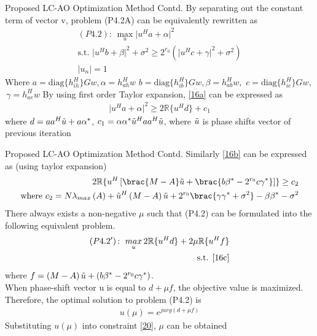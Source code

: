 \documentclass{beamer}
\providecommand{\brak}[1]{\ensuremath{\left(#1\right)}}
\providecommand{\abs}[1]{\vert#1\vert}
\providecommand{\sbrak}[1]{\ensuremath{{}\left[#1\right]}}
\begin{document}
\begin{frame}{Proposed LC-AO Optimization Method Contd.}
    By separating out the constant term of vector
v, problem (P4.2A) can be equivalently rewritten as
    \begin{align}
    \brak{P4.2}\text{: }\mathop{max}_{u} \abs{u^{H}a+\alpha}^2 \label{16a}\\ 
    \text{s.t. } \abs{u^{H}b+\beta}^{2}+\sigma^{2}\geq 2^{r_{0}}\brak{ \abs{u^{H}c+\gamma}^{2}+\sigma^{2}}\label{16b}\\
    \abs{u_{n}}=1 \label{16c}
    \end{align}
    Where  $a=\text{diag}\{h^{H}_{ih}\}Gw$,\,$\alpha=h_{ah}^{H}w$ $b=\text{diag}\{h^{H}_{ib}\}Gw$,\,$\beta=h_{ab}^{H}w$, \,$c=\text{diag}\{h^{H}_{ie}\}Gw$, \,$\gamma=h_{ae}^{H}w$
    By using first order Taylor expansion, \eqref{16a} can be expressed as 
    \begin{align}
        \abs{u^{H}a+\alpha}^2\geq 2\mathbb{R}\{u^{H}d\} +c_{1}
    \end{align}
    where $d=aa^{H}\Tilde{u}+a\alpha^{*}$, $c_{1}=\alpha\alpha^{*}\Tilde{u}^{H}aa^{H}\Tilde{u}$, where $\Tilde{u}$ is phase shifts vector of previous iteration 
\end{frame}
\begin{frame}{Proposed LC-AO Optimization Method Contd.}
    Similarly \eqref{16b} can be expressed as (using taylor expansion)
    \begin{align}
    2\mathbb{R}\{u^{H}\sbrak{\brac{M-A}\Tilde{u}+\brac{b\beta^{*}-2^{r_{0}}c\gamma^{*}}}\}\geq c_{2}\label{20}\\
    \text{where  } c_{2}=N\lambda_{max}\brak{A}+\Tilde{u}^{H}\brak{M-A}\Tilde{u}+2^{r_{0}}\brac{\gamma \gamma^{*} + \sigma^{2}}-\beta \beta^{*}-\sigma^{2}
    \end{align}
    There always exists
a non-negative $\mu$ such that (P4.2) can be formulated into the
following equivalent problem.
    \begin{align}
    \brak{P4.2'}\text{: }\mathop{max}_{u}  2\mathbb{R}\{u^{H}d\}+2\mu \mathbb{R}\{u^{H}f\}\\ 
    \text{s.t. } \eqref{16c}
    \end{align}
    where $f=\brak{M-A}\Tilde{u}+\brak{b\beta^{*}-2^{r_{0}}c\gamma^{*}}$.\\
     When phase-shift
vector u is equal to $d+\mu f$, the objective value is maximized.
Therefore, the optimal solution to problem (P4.2) is
\begin{align}
    u\brak{\mu}=e^{j arg\brak{d+\mu f}}
\end{align}
    Substituting $u\brak{\mu}$ into constraint \eqref{20},
$\mu$ can be obtained
\end{frame}
\end{document}
